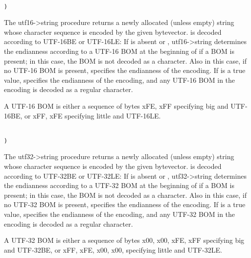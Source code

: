 \begin{entry}{%
}
{\tt\obeyspaces\\
     )}

 The {\cf utf16->string} procedure returns
a newly allocated (unless empty) string whose character sequence is
encoded by the given bytevector.   is decoded
according to UTF-16BE or UTF-16LE: If  is
absent or \schfalse, {\cf utf16->string} determines the endianness
according to a UTF-16 BOM at the beginning of  if a
BOM is present; in this case, the BOM is not decoded as a character.
Also in this case, if no UTF-16 BOM is present, 
specifies the endianness of the encoding.  If
 is a true value, 
specifies the endianness of the encoding, and any UTF-16 BOM in the
encoding is decoded as a regular character.

\begin{note}
  A UTF-16 BOM is either a sequence of bytes \sharpsign{}xFE,
  \sharpsign{}xFF specifying {\cf big} and UTF-16BE, or \sharpsign{}xFF,
  \sharpsign{}xFE specifying {\cf little} and UTF-16LE.
\end{note}
\end{entry}

\begin{entry}{%
}
{\tt\obeyspaces\\
     )}

 The {\cf utf32->string} procedure returns
a newly allocated (unless empty) string whose character sequence is
encoded by the given bytevector.   is decoded
according to UTF-32BE or UTF-32LE: If  is
absent or \schfalse, {\cf utf32->string} determines the endianness
according to a UTF-32 BOM at the beginning of  if a
BOM is present; in this case, the BOM is not decoded as a character.
Also in this case, if no UTF-32 BOM is present, 
specifies the endianness of the encoding.  If
 is a true value, 
specifies the endianness of the encoding, and any UTF-32 BOM in the
encoding is decoded as a regular character.

\begin{note}
  A UTF-32 BOM is either a sequence of bytes \sharpsign{}x00,
  \sharpsign{}x00, \sharpsign{}xFE, \sharpsign{}xFF specifying {\cf
    big} and UTF-32BE, or \sharpsign{}xFF, \sharpsign{}xFE,
  \sharpsign{}x00, \sharpsign{}x00, specifying {\cf little} and
  UTF-32LE.
\end{note}
\end{entry}

